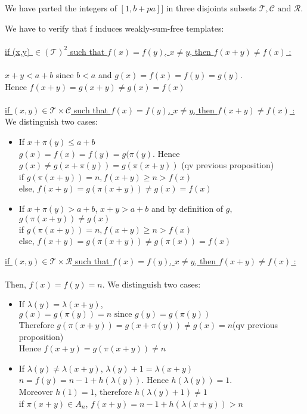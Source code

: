 We have parted the integers of \(\![1,b+pa]\!]\) in three disjoints subsets \(\mathcal{T},\mathcal{C} \text{ and } \mathcal{R}\).

We have to verify that f induces weakly-sum-free templates:\\
\\
\underline{if (x,y) \(\in (\mathcal{T})^2\) such that \(f(x)=f(y)\), \(x \neq y\), then \(f(x+y)\neq f(x)\)  :}\\
\\\(x+y<a+b\) since \(b<a\) and \(g(x)=f(x)=f(y)=g(y)\).
\\Hence \(f(x+y)=g(x+y)\neq g(x)=f(x)\)
\\\\
\underline{if \((x,y) \in \mathcal{T} \times \mathcal{C}\) such that \(f(x)=f(y)\), \(x \neq y\), then \(f(x+y)\neq f(x)\)  :}\\
We distinguish two cases:


\begin{itemize}
\item If \(x+\pi(y)\leqslant a+b\)
\\\(g(x)=f(x)=f(y)=g(\pi(y)\). Hence \(g(x)\neq g(x+\pi(y))=g(\pi(x+y))\) (qv previous proposition)
\\if \(g(\pi(x+y))=n, f(x+y)\geqslant n > f(x)\)
\\else, \(f(x+y)=g(\pi(x+y))\neq g(x)=f(x)\)
\item If \(x+\pi(y)> a+b\), \(x+y>a+b\) and by definition of \(g\), \(g(\pi(x+y))\neq g(x)\)
\\if \(g(\pi(x+y))=n, f(x+y)\geqslant n > f(x)\)
\\else, \(f(x+y)=g(\pi(x+y))\neq g(\pi(x))=f(x)\)
\end{itemize}


\underline{if \((x,y) \in \mathcal{T} \times \mathcal{R}\) such that \(f(x)=f(y)\), \(x \neq y\), then \(f(x+y)\neq f(x)\)  :}\\
\\Then, \(f(x)=f(y)=n\). We distinguish two cases:


\begin{itemize}
\item If \(\lambda(y)=\lambda(x+y)\),
\\\(g(x)=g(\pi(y))=n \text{ since } g(y)=g(\pi(y))\)
\\Therefore \(g(\pi(x+y))=g(x+\pi(y)) \neq g(x)=n\)(qv previous proposition)
\\Hence \(f(x+y)=g(\pi(x+y))\neq n\)
\item If  \(\lambda(y)\neq \lambda(x+y)\), \(\lambda(y)+1= \lambda(x+y)\)\\
\(n=f(y)=n-1+h(\lambda(y))\). Hence \(h(\lambda(y))=1\).
\\Moreover \(h(1)=1\), therefore \(h(\lambda(y)+1) \neq 1\)
\\if \(\pi(x+y) \in A_n\), \(f(x+y)=n-1+h(\lambda(x+y))>n\)
\end{itemize}

